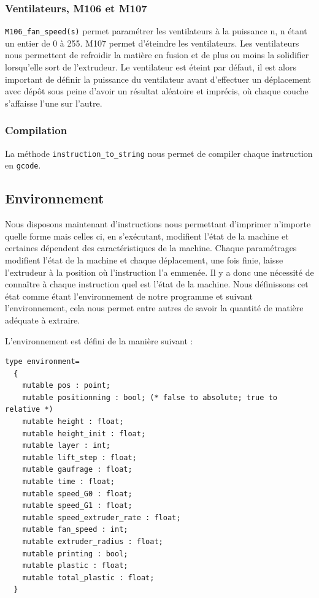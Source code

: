 \documentclass[11pt, titlepage]{article}
\begin{document}
	\subsubsection{Ventilateurs, M106 et M107}
	\verb&M106_fan_speed(s)& permet paramétrer les ventilateurs à la puissance n, n étant un entier de 0 à 255.
M107 permet d'éteindre les ventilateurs.
Les ventilateurs nous permettent de refroidir la matière en fusion et de plus ou moins la solidifier lorsqu'elle sort de l'extrudeur.
Le ventilateur est éteint par défaut, il est alors important de définir la puissance du ventilateur avant d'effectuer un déplacement avec dépôt sous peine d'avoir un résultat aléatoire et imprécis, où chaque couche s'affaisse l'une sur l'autre.
	\subsubsection{Compilation}
	La méthode \verb&instruction_to_string& nous permet de compiler chaque instruction en \verb&gcode&.

\subsection{Environnement}
Nous disposons maintenant d'instructions nous permettant d'imprimer n'importe quelle forme mais celles ci, en s'exécutant, modifient l'état de la machine et certaines dépendent des caractéristiques de la machine. Chaque paramétrages modifient l'état de la machine et chaque déplacement, une fois finie, laisse l'extrudeur à la position où l'instruction l'a emmenée. Il y a donc une nécessité de connaître à chaque instruction quel est l'état de la machine. Nous définissons cet état comme étant l'environnement de notre programme et suivant l'environnement, cela nous permet entre autres de savoir la quantité de matière adéquate à extraire.
\newline

L'environnement est défini de la manière suivant :
\begin{lstlisting}
type environment=
  {
    mutable pos : point;
    mutable positionning : bool; (* false to absolute; true to relative *)
    mutable height : float;
    mutable height_init : float;
    mutable layer : int;
    mutable lift_step : float;
    mutable gaufrage : float;
    mutable time : float;
    mutable speed_G0 : float;
    mutable speed_G1 : float;
    mutable speed_extruder_rate : float;
    mutable fan_speed : int;
    mutable extruder_radius : float;
    mutable printing : bool;
    mutable plastic : float;
    mutable total_plastic : float;
  }
\end{lstlisting}
\end{document}
